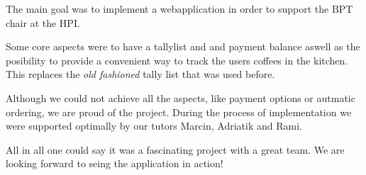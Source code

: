 The main goal was to implement a webapplication in order to support the
BPT chair at the HPI.

Some core aspects were to have a tallylist and and payment balance
aswell as the posibility to provide a convenient way to track the users
coffees in the kitchen. This replaces the \emph{old fashioned} tally
list that was used before.

Although we could not achieve all the aspects, like payment options or
autmatic ordering, we are proud of the project. During the process of
implementation we were supported optimally by our tutors Marcin,
Adriatik and Rami.

All in all one could say it was a fascinating project with a great team.
We are looking forward to seing the application in action!
